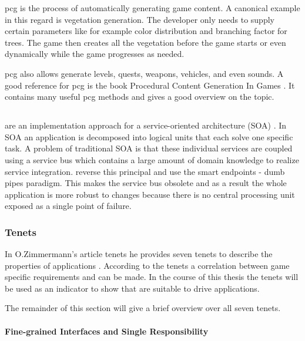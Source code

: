 \gls{pcg} is the process of automatically generating game content. A canonical
example in this regard is vegetation generation. The developer only needs to
supply certain parameters like for example color distribution and branching
factor for trees. The game then creates all the vegetation before the game
starts or even dynamically while the game progresses as needed.

\gls{pcg} also allows generate levels, quests, weapons, vehicles, and even
sounds. A good reference for \gls{pcg} is the book Procedural Content Generation In
Games \cite{shaker2014procedural}. It contains many useful \gls{pcg} methods and
gives a good overview on the topic.

\subsection{\mss{}}

\mss{} are an implementation approach for a service-oriented architecture (SOA)
\cite{zimmermann2016microservices}. In SOA an application is decomposed into
logical units that each solve one specific task. A problem of traditional SOA is
that these individual services are coupled using a service bus which contains a
large amount of domain knowledge to realize service integration. \mss{} reverse
this principal and use the smart endpoints - dumb pipes paradigm. This makes the
service bus obsolete and as a result the whole application is more robust to
changes because there is no central processing unit exposed as a single point of
failure.

\subsubsection{\ms{} Tenets}

In O.Zimmermann's article \ms{} tenets he provides seven \ms{} tenets to
describe the properties of \ms{} applications
\cite{zimmermann2016microservices}. According to the tenets a correlation
between game specific requirements and \ogs{} can be made. In the course of this
thesis the \ms{} tenets will be used as an indicator to show that \mss{} are
suitable to drive \og{} applications.

The remainder of this section will give a brief overview over all seven tenets.

\paragraph{Fine-grained Interfaces and Single Responsibility}

